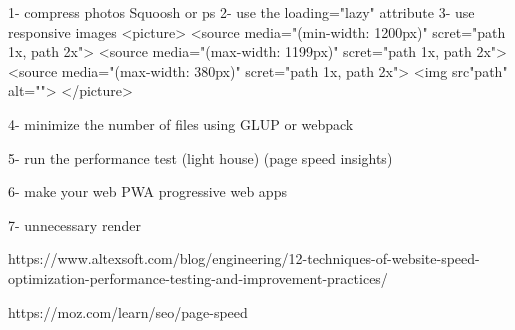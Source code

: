 1- compress photos   Squoosh or ps  
2- use the loading="lazy" attribute 
3- use responsive images 
  <picture> 
    <source media="(min-width: 1200px)" scret="path 1x, path 2x">
    <source media="(max-width: 1199px)" scret="path 1x, path 2x">
    <source media="(max-width: 380px)" scret="path 1x, path 2x">
  <img src"path" alt="">
  </picture>

4- minimize the number of files using GLUP or webpack 

5- run the performance test (light house) (page speed insights)

6- make your web PWA 
  progressive 
  web 
  apps 

7- unnecessary render

https://www.altexsoft.com/blog/engineering/12-techniques-of-website-speed-optimization-performance-testing-and-improvement-practices/

https://moz.com/learn/seo/page-speed